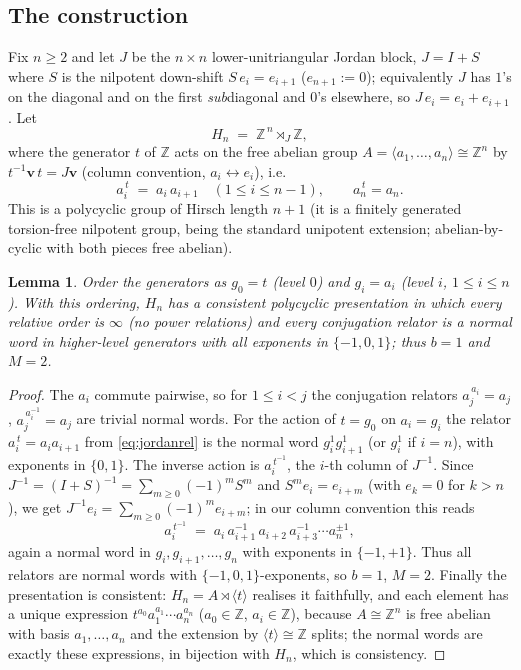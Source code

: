 \documentclass{amsart}
\newtheorem{lemma}{Lemma}
\theoremstyle{definition}
\begin{document}
\subsection*{The construction}
Fix $n\ge2$ and let $J$ be the $n\times n$ lower-unitriangular Jordan block,
$J=I+S$ where $S$ is the nilpotent down-shift $S\,e_i=e_{i+1}$ ($e_{n+1}:=0$); equivalently $J$
has $1$'s on the diagonal and on the first \emph{sub}diagonal and $0$'s elsewhere, so
$J\,e_i=e_i+e_{i+1}$. Let
\[
H_n \;=\; \mathbb Z^{\,n}\rtimes_{J}\mathbb Z ,
\]
where the generator $t$ of $\mathbb Z$ acts on the free abelian group
$A=\langle a_1,\dots,a_n\rangle\cong\mathbb Z^{n}$ by $t^{-1}\mathbf v\,t=J\mathbf v$ (column
convention, $a_i\leftrightarrow e_i$), i.e.
\begin{equation}\label{eq:jordanrel}
a_i^{\,t}\;=\;a_i\,a_{i+1}\quad(1\le i\le n-1),\qquad a_n^{\,t}=a_n .
\end{equation}
This is a polycyclic group of Hirsch length $n+1$ (it is a finitely generated torsion-free
nilpotent group, being the standard unipotent extension; abelian-by-cyclic with both pieces
free abelian). 

\begin{lemma}\label{lem:Hpres}
Order the generators as $g_0=t$ \textup{(}level $0$\textup{)} and $g_i=a_i$ \textup{(}level
$i$, $1\le i\le n$\textup{)}. With this ordering, $H_n$ has a consistent polycyclic presentation
in which every relative order is $\infty$ \textup{(}no power relations\textup{)} and every
conjugation relator is a normal word in higher-level generators with all exponents in
$\{-1,0,1\}$; thus $b=1$ and $M=2$.
\end{lemma}

\begin{proof}
The $a_i$ commute pairwise, so for $1\le i<j$ the conjugation relators $a_j^{\,a_i}=a_j$,
$a_j^{\,a_i^{-1}}=a_j$ are trivial normal words. For the action of $t=g_0$ on $a_i=g_i$ the
relator $a_i^{\,t}=a_i a_{i+1}$ from \eqref{eq:jordanrel} is the normal word $g_i^{1}g_{i+1}^{1}$
(or $g_i^1$ if $i=n$), with exponents in $\{0,1\}$. The inverse action is
$a_i^{\,t^{-1}}$, the $i$-th column of $J^{-1}$. Since $J^{-1}=(I+S)^{-1}=\sum_{m\ge0}(-1)^mS^m$
and $S^m e_i=e_{i+m}$ (with $e_k=0$ for $k>n$), we get $J^{-1}e_i=\sum_{m\ge0}(-1)^m e_{i+m}$;
in our column convention this reads
\[
a_i^{\,t^{-1}}\;=\;a_i\,a_{i+1}^{-1}\,a_{i+2}\,a_{i+3}^{-1}\cdots a_n^{\pm1},
\]
again a normal word in $g_i,g_{i+1},\dots,g_n$ with exponents in $\{-1,+1\}$. Thus all relators
are normal words with $\{-1,0,1\}$-exponents, so $b=1$, $M=2$. Finally the presentation is
consistent: $H_n=A\rtimes\langle t\rangle$ realises it faithfully, and each element has a unique
expression $t^{a_0}a_1^{a_1}\cdots a_n^{a_n}$ ($a_0\in\mathbb Z$, $a_i\in\mathbb Z$), because
$A\cong\mathbb Z^n$ is free abelian with basis $a_1,\dots,a_n$ and the extension by
$\langle t\rangle\cong\mathbb Z$ splits; the normal words are exactly these expressions, in
bijection with $H_n$, which is consistency.
\end{proof}
\end{document}
